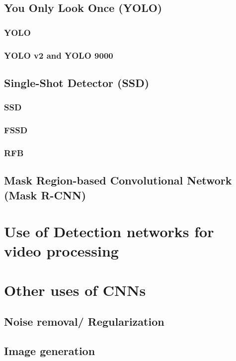 \subsection{You Only Look Once (YOLO)}
\subsubsection{YOLO}
\label{yolo}
\subsubsection{YOLO v2 and YOLO 9000}

\subsection{Single-Shot Detector (SSD)}
\label{ssd}
\subsubsection{SSD}

\subsubsection{FSSD}
\subsubsection{RFB}

\subsection{Mask Region-based Convolutional Network (Mask R-CNN)}

\section{Use of Detection networks for video processing}

\section{Other uses of CNNs}
\subsection{Noise removal/ Regularization}
\subsection{Image generation}




